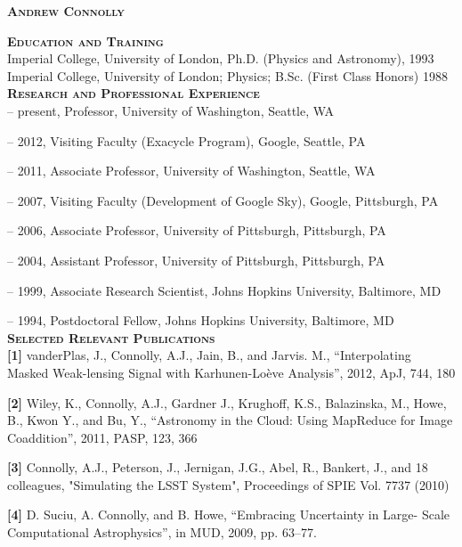 \documentclass[12pt,tightenlines]{revtex4} %
\begin{document}
\begin{center}
{\large\bf \scshape Andrew Connolly}\\
\end{center}

\noindent
{\bf \scshape Education and Training}\\
\noindent
Imperial College, University of London, Ph.D. (Physics and Astronomy),  1993\\
Imperial College, University of London; Physics; B.Sc. (First Class Honors) 1988\\

\noindent
{\bf \scshape Research and Professional Experience}\\
 --  present,  Professor, University of Washington, Seattle, WA

 -- 2012, Visiting Faculty (Exacycle Program), Google, Seattle, PA 

 --  2011,  Associate Professor, University of Washington, Seattle, WA

 -- 2007, Visiting Faculty (Development of Google Sky), Google, Pittsburgh, PA 

 -- 2006, Associate Professor, University of Pittsburgh, Pittsburgh, PA 

 -- 2004, Assistant Professor, University of Pittsburgh, Pittsburgh, PA 


 -- 1999, Associate Research Scientist, Johns Hopkins University, Baltimore, MD 


 -- 1994, Postdoctoral Fellow, Johns Hopkins University, Baltimore, MD \\

\noindent
{\bf \scshape Selected Relevant Publications}\\
\noindent
{\bf[1]} vanderPlas, J., Connolly, A.J., Jain, B., and Jarvis. M., ``Interpolating Masked Weak-lensing Signal with Karhunen-Lo\`{e}ve Analysis'', 2012, ApJ, 744, 180

\noindent 
{\bf[2]} Wiley, K., Connolly, A.J., Gardner J., Krughoff, K.S., Balazinska, M., Howe, B., Kwon Y., and Bu, Y., ``Astronomy in the Cloud: Using MapReduce for Image Coaddition'', 2011, PASP, 123, 366

\noindent
{\bf[3]} Connolly, A.J., Peterson, J., Jernigan, J.G., Abel, R.,
Bankert, J., and 18 colleagues, "Simulating the LSST System",
Proceedings of SPIE Vol. 7737 (2010)
 
\noindent
{\bf[4]}  D. Suciu, A. Connolly, and B. Howe,  ``Embracing Uncertainty in Large- Scale Computational Astrophysics'', in MUD, 2009, pp. 63--77.
\end{document}
